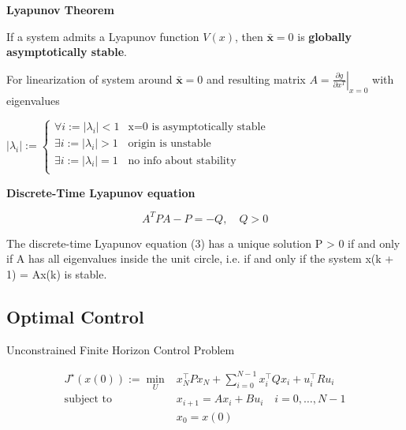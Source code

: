\begin{sstTitleBox}[Plum]{\center\textbf{\large
			Lyapunov Theorem
		}}
	\begin{theorem}
		If a system admits a Lyapunov function $V(x)$,
		then $\bar{\mathbf{x}} = 0$ is
		\textbf{globally asymptotically stable}.
	\end{theorem}


	\begin{theorem}
		For linearization of system around $\bar{\mathbf{x}}=0$
		and resulting matrix
		$A=\left.\frac{\partial g}{\partial x^T}\right|_{x=0}$
		with eigenvalues

		$|\lambda_i| :=
			\begin{cases}
				\forall i := |\lambda_i| < 1 & \text{{x=0} is asymptotically stable} \\
				\exists i := |\lambda_i| > 1 & \text{origin is unstable}             \\
				\exists i := |\lambda_i| = 1 & \text{no info about stability}        \\
			\end{cases}$
	\end{theorem}

	\textbf{Discrete-Time Lyapunov equation}

	\[A^TPA-P=-Q,\quad Q>0\]

	\begin{theorem}
		The discrete-time Lyapunov equation (3) has a unique solution P > 0 if and
		only if A has all eigenvalues inside the unit circle, i.e. if and only if the system
		x(k + 1) = Ax(k) is stable.
	\end{theorem}
\end{sstTitleBox}

\subsection{Optimal Control}


Unconstrained Finite Horizon Control Problem

$$\begin{aligned}
		J^\star(x(0)) :=
		\min_U & x_N^\top P x_N +
		\textstyle\sum_{i=0}^{N-1}
		x_i^\top Q x_i + u_i^\top R u_i
		\\
		\text{subject to  }
		       & x_{i+1}                = Ax_i+Bu_i
		\quad i  = 0,\dots,N-1                      \\
		       & x_0                    = x(0)
	\end{aligned}$$

